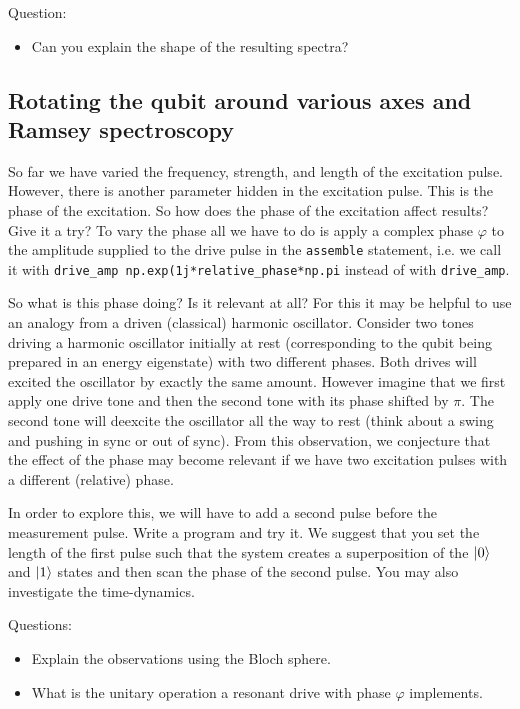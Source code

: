 \documentclass{../lab}
\begin{document}
Question:
\begin{itemize}
    \item Can you explain the shape of the resulting spectra?
\end{itemize}

\subsection{Rotating the qubit around various axes and Ramsey spectroscopy}
So far we have varied the frequency, strength, and length of the excitation pulse. However, there is another parameter hidden in the excitation pulse. This is the phase of the excitation. So how does the phase of the excitation affect results? Give it a try? To vary the phase all we have to do is apply a complex phase $\varphi$ to the amplitude supplied to the drive pulse in the \verb|assemble| statement, i.e. we call it with \verb|drive_amp np.exp(1j*relative_phase*np.pi| instead of with \verb|drive_amp|. 

So what is this phase doing? Is it relevant at all? For this it may be helpful to use an analogy from a driven (classical) harmonic oscillator. Consider two tones driving a harmonic oscillator initially at rest (corresponding to the qubit being prepared in an energy eigenstate) with two different phases. Both drives will excited the oscillator by exactly the same amount. However imagine that we first apply one drive tone and then the second tone with its phase shifted by $\pi$. The second tone will deexcite the oscillator all the way to rest (think about a swing and pushing in sync or out of sync). From this observation, we conjecture that the effect of the phase may become relevant if we have two excitation pulses with a different (relative) phase. 

In order to explore this, we will have to add a second pulse before the measurement pulse. Write a program and try it. We suggest that you set the length of the first pulse such that the system creates a superposition of the $\ket{0}$ and $\ket{1}$ states and then scan the phase of the second pulse. You may also investigate the time-dynamics. 

Questions:
\begin{itemize}
    \item Explain the observations using the Bloch sphere. 
    \item 
    What is the unitary operation a resonant drive with phase $\varphi$ implements. 
\end{itemize}
\end{document}
